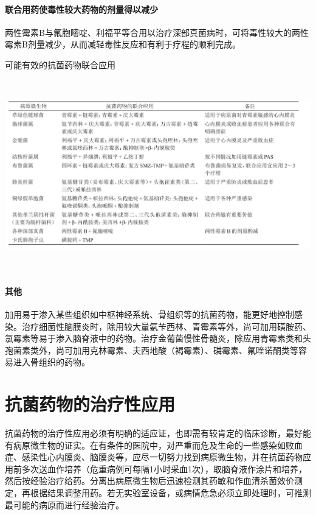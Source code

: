 \paragraph{联合用药使毒性较大药物的剂量得以减少}

两性霉素B与氟胞嘧啶、利福平等合用以治疗深部真菌病时，可将毒性较大的两性霉素B剂量减少，从而减轻毒性反应和有利于疗程的顺利完成。

\begin{table}[htbp]
\centering
\caption{可能有效的抗菌药物联合应用}
\label{tab154-2}
\includegraphics[width=6.8125in,height=3.27083in]{./images/Image00588.jpg}
\end{table}

\paragraph{其他}

加用易于渗入某些组织如中枢神经系统、骨组织等的抗菌药物，能更好地控制感染。治疗细菌性脑膜炎时，除用较大量氨苄西林、青霉素等外，尚可加用磺胺药、氯霉素等易于渗入脑脊液中的药物。治疗金葡菌慢性骨髓炎，除应用青霉素类和头孢菌素类外，尚可加用克林霉素、夫西地酸（褐霉素）、磷霉素、氟喹诺酮类等容易进入骨组织的药物。

\protect\hypertarget{text00433.html}{}{}

\section{抗菌药物的治疗性应用}

抗菌药物的治疗性应用必须有明确的适应证，也即需有较肯定的临床诊断，最好能有病原微生物的证实。在有条件的医院中，对严重而危及生命的一些感染如败血症、感染性心内膜炎、脑膜炎等，应尽一切努力找到病原微生物，并在抗菌药物应用前多次送血作培养（危重病例可每隔1小时采血1次），取脑脊液作涂片和培养，然后按经验治疗给药。分离出病原微生物后迅速检测其药敏和作血清杀菌效价测定，再根据结果调整用药。若无实验室设备，或病情危急必须立即处理时，可推测最可能的病原而进行经验治疗。

